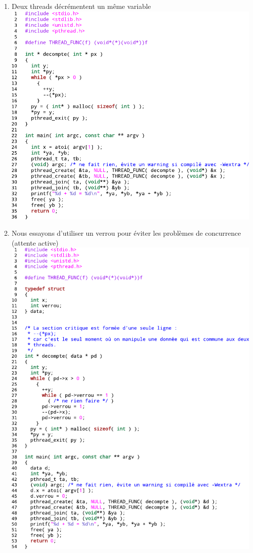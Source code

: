 \begin{enumerate}
\end{enumerate} \newpage
{}
\begin{enumerate}
	\item Deux threads décrémentent un même variable\\
\includegraphics[width=\linewidth]{fig28.pdf}\newpage
	\item Nous essayons d'utiliser un verrou pour éviter les problèmes de concurrence (attente active)\\
\includegraphics[width=\linewidth]{fig29.pdf}\\
\end{enumerate}
